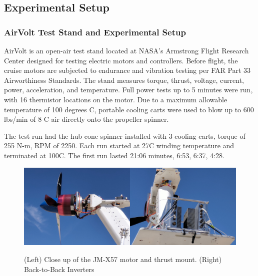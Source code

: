 \documentclass[]{aiaa-tc}%
\begin{document}

\subsection{Experimental Setup}
\subsubsection{AirVolt Test Stand and Experimental Setup}

AirVolt is an open-air test stand located at NASA's Armstrong Flight Research Center designed for testing electric motors and controllers.\cite{Aamod_2015} Before flight, the cruise motors are subjected to endurance and vibration testing per FAR Part 33 Airworthiness Standards. The stand measures torque, thrust, voltage, current, power, acceleration, and temperature. Full power tests up to 5 minutes were run, with 16 thermistor locations on the motor. Due to a maximum allowable temperature of 100 degrees C, portable cooling carts were used to blow up to 600 lbs/min of 8 \degree C air directly onto the propeller spinner. 

The test run had the hub cone spinner installed with 3 cooling carts, torque of 255 N-m, RPM of 2250. Each run started at 27C winding temperature and terminated at 100C. The first run lasted 21:06 minutes, 6:53, 6:37, 4:28.

\begin{figure}[!htb]%
	\centering
	\includegraphics[width=0.5\textwidth]{figures/AirVoltSide.jpg}\includegraphics[width=0.5\textwidth]{figures/AirVolt_Back.jpg}
	\caption{(Left) Close up of the JM-X57 motor and thrust mount. (Right) Back-to-Back Inverters}
	\label{fig:airvolt2}
\end{figure}
\end{document}
